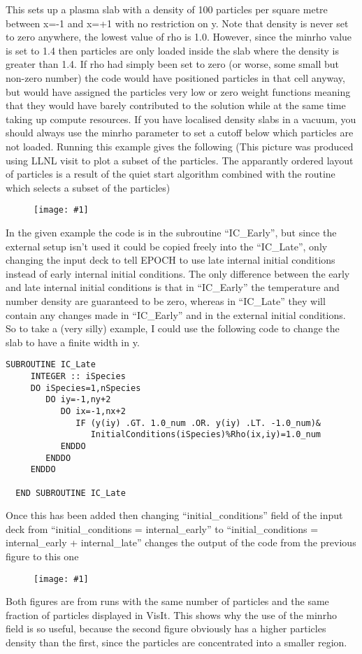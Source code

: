 \documentclass[12pt]{article}
\newcommand{\simpleboxverbatim}{\begin{Verbatim}[obeytabs=true,frame=single,
  framerule=0.5mm,rulecolor=\color{warwickmid}]}
\newcommand{\nEPOCH}{{\color{warwickdark}\fontfamily{phv}\selectfont EPOCH}}
\newcommand{\EPOCH}{{\nEPOCH} }
\newcommand{\image}[1]
  {{\begin{figure} \centering \texttt{[image: \#1]} \end{figure}}}
\begin{document}
This sets up a plasma slab with a density of 100 particles per square metre
between x=-1 and x=+1 with no restriction on y. Note that density is never set
to zero anywhere, the lowest value of rho is 1.0. However, since the minrho
value is set to 1.4 then particles are only loaded inside the slab where the
density is greater than 1.4. If rho had simply been set to zero (or worse,
some small but non-zero number) the code would have positioned particles in
that cell anyway, but would have assigned the particles very low or zero
weight functions meaning that they would have barely contributed to the
solution while at the same time taking up compute resources. If you have
localised density slabs in a vacuum, you should always use the minrho
parameter to set a cutoff below which particles are not loaded. Running this
example gives the following (This picture was produced using LLNL visit to
plot a subset of the particles. The apparantly ordered layout of particles is
a result of the quiet start algorithm combined with the routine which selects
a subset of the particles)\\
%Example image from visit for these initial conditions
\image{./images/example.eps}
In the given example the code is in the subroutine ``IC\_Early'', but since
the external setup isn't used it could be copied freely into the ``IC\_Late'',
only changing the input deck to tell \EPOCH to use late internal initial
conditions instead of early internal initial conditions. The only difference
between the early and late internal initial conditions is that in
``IC\_Early'' the temperature and number density are guaranteed to be zero,
whereas in ``IC\_Late'' they will contain any changes made in ``IC\_Early''
and in the external initial conditions. So to take a (very silly) example, I
could use the following code to change the slab to have a finite width in y.

\simpleboxverbatim
  SUBROUTINE IC_Late
     INTEGER :: iSpecies
     DO iSpecies=1,nSpecies
        DO iy=-1,ny+2
           DO ix=-1,nx+2
              IF (y(iy) .GT. 1.0_num .OR. y(iy) .LT. -1.0_num)&
                 InitialConditions(iSpecies)%Rho(ix,iy)=1.0_num
           ENDDO
        ENDDO
     ENDDO

  END SUBROUTINE IC_Late
\end{Verbatim}

Once this has been added then changing ``initial\_conditions'' field of the
input deck from ``initial\_conditions = internal\_early'' to
``initial\_conditions = internal\_early + internal\_late'' changes the output
of the code from the previous figure to this one\\
\image{./images/example2.eps}
Both figures are from runs with the same number of particles and the same
fraction of particles displayed in VisIt. This shows why the use of the minrho
field is so useful, because the second figure obviously has a higher particles
density than the first, since the particles are concentrated into a smaller
region.
\end{document}
